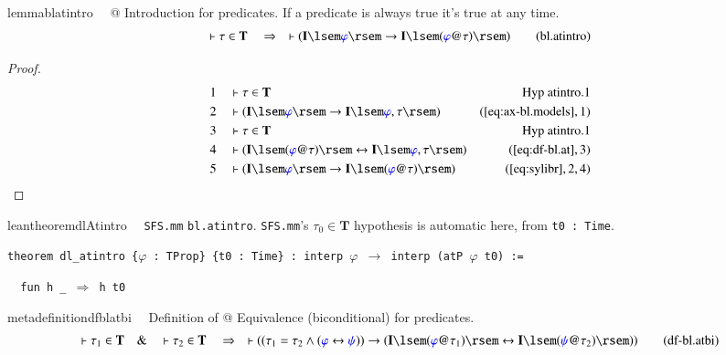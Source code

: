 \begin{restatable}{lemma}{blatintro}~~ @ Introduction for predicates.
   If a predicate is always true it's true at any time.
\begin{align}
\vdash \tau \in \mathbf{T}\quad\Rightarrow\quad \vdash ( \mathbf{I} \lsem
    \mw{\varphi} \rsem \rightarrow \mathbf{I} \lsem ( \mw{\varphi} @ \tau )
    \rsem )\label{eq:bl.atintro}\tag{bl.atintro}
\end{align}
\end{restatable}

\begin{proof}
\begin{align}
  1 &&  & \vdash \tau \in \mathbf{T}&\text{Hyp~atintro.1}\notag%
  \\ 2 &&  & \vdash ( \mathbf{I} \lsem \mw{\varphi} \rsem \rightarrow
      \mathbf{I} \lsem \mw{\varphi} , \tau \rsem
      )&(\mbox{\ref{eq:ax-bl.models}},1)\notag
  \\ 3 &&  & \vdash \tau \in \mathbf{T}&\text{Hyp~atintro.1}\notag%
  \\ 4 &&  & \vdash ( \mathbf{I} \lsem ( \mw{\varphi} @ \tau ) \rsem
      \leftrightarrow \mathbf{I} \lsem \mw{\varphi} , \tau
      \rsem )&(\mbox{\ref{eq:df-bl.at}},3)\notag
  \\ 5 &&  & \vdash ( \mathbf{I} \lsem \mw{\varphi} \rsem \rightarrow
      \mathbf{I} \lsem ( \mw{\varphi} @ \tau ) \rsem
      )&(\mbox{\ref{eq:sylibr}},2,4)\notag
\end{align}
\end{proof}

\begin{restatable}{leantheorem}{dlAtintro}~~ \texttt{SFS.mm} \texttt{bl.atintro}. \texttt{SFS.mm}'s $\tau_0\in\mathbf{T}$ hypothesis is automatic here, from \texttt{t0 : Time}.

\texttt{\textcolor{leancolor}{theorem} \textcolor{leanyellow}{dl\_atintro} \{$\varphi$ : TProp\} \{t0 : Time\} : interp $\varphi$ $\to$ interp (atP $\varphi$ t0) :=}

\texttt{~~\textcolor{leancolor}{fun} h \_ $\Rightarrow$ h t0}
\label{dl_atintro}
\end{restatable}

\begin{restatable}{metadefinition}{dfblatbi}~~ Definition of @ Equivalence
(biconditional) for predicates.
\begin{align}
\vdash \tau_1 \in \mathbf{T}\quad\&\quad \vdash \tau_2 \in
    \mathbf{T}\quad\Rightarrow\quad \vdash ( ( \tau_1 = \tau_2 \wedge (
    \mw{\varphi} \leftrightarrow \mw{\psi} ) ) \rightarrow ( \mathbf{I} \lsem (
    \mw{\varphi} @ \tau_1 ) \rsem \leftrightarrow \mathbf{I} \lsem ( \mw{\psi}
    @ \tau_2 ) \rsem ) )\label{eq:df-bl.atbi}\tag{df-bl.atbi}
\end{align}
\end{restatable}

